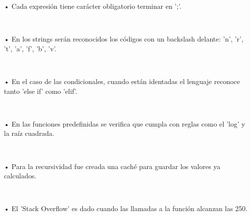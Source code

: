 \documentclass[letterpaper]{article}
\begin{document}
{• Cada expresión tiene carácter obligatorio terminar en ';'.

\

• En los strings serán reconocidos los códigos con un backslash delante: 'n', 'r', 't', 'a', 'f', 'b', 'v'.

\

• En el caso de las condicionales, cuando están identadas el lenguaje reconoce tanto 'else if' como 'elif'.

\

• En las funciones predefinidas se verifica que cumpla con reglas como el 'log' y la raíz cuadrada. 

\

• Para la recursividad fue creada una caché para guardar los valores ya calculados.

\

• El 'Stack Overflow' es dado cuando las llamadas a la función alcanzan las 250. 
}
\end{document}
